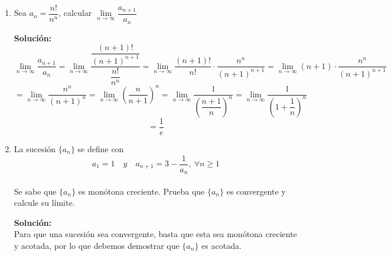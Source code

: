 \documentclass[12pt]{article}
\newenvironment{solucion}
{\begin{mdframed}[backgroundcolor=black!10]
		{\bf Solución:}\\
	}
	{
	\end{mdframed}
}
\newenvironment{preguntas}
{\begin{enumerate}\itemsep12pt
	}
	{
	\end{enumerate}
}
\newcommand{\ra}{\rightarrow}
\begin{document}
\begin{preguntas}
\begin{solucion}
\begin{enumerate}[a)]
\item $\left\{1, -\dfrac{2}{3}, \dfrac{4}{9}, -\dfrac{8}{27}, \dots \right\}$\\
			\\
			Observando la sucesión, resulta evidente que el numerador es $2^n$ y el\\ denominador $3^n$. Además, vemos que es alternante, por lo que el término general será
			$$a_n = (-1)^n \dfrac{2^{n}}{3^{n}}$$
			Luego, el límite de la sucesión es igual al límite del termino general, que sería
			$$\lim\limits_{n\ra \infty} a_n = \lim\limits_{n\ra \infty} (-1)^n \dfrac{2^{n}}{3^{n}} = 
			\lim\limits_{n\ra \infty} (-1)^n \left(\dfrac{2}{3}\right)^n = 0$$
\item $\left\{\sqrt[]{2}, \sqrt[]{2\ \sqrt[]{2}}, \sqrt[]{2\ \sqrt[]{2\ \sqrt[]{2}}}, \dots \right\}$\\
Notemos que la sucesión también la podemos escribir como
$$\left\{\sqrt[]{2}, \sqrt[4]{8}, \sqrt[8]{128}, \dots \right\}$$
$$\left\{\sqrt[]{2}, \sqrt[4]{2^3}, \sqrt[8]{2^7}, \dots \right\}$$
$$\left\{2^{1/2}, 2^{3/4}, 2^{7/8}, \dots \right\}$$
Luego,
$$a_n = 2^{\frac{2^n-1}{2^n}}$$
Finalmente,
$$\lim\limits_{n\ra \infty} a_n = \lim\limits_{n\ra \infty} 2^{\frac{2^n-1}{2^n}} = 2$$
\end{enumerate}
\end{solucion}
\item Sea $a_n = \dfrac{n!}{n^n}$, calcular $\lim\limits_{n \ra \infty} \dfrac{a_{n+1}}{a_n}$
\begin{solucion}
$$\lim\limits_{n \ra \infty} \dfrac{a_{n+1}}{a_n} = \lim\limits_{n \ra \infty} \dfrac{\dfrac{(n+1)!}{(n+1)^{n+1}}}{\dfrac{n!}{n^n}} = \lim\limits_{n \ra \infty} \dfrac{(n+1)!}{n!} \cdot \dfrac{n^n}{(n+1)^{n+1}} =\lim\limits_{n \ra \infty} (n+1) \cdot \dfrac{n^n}{(n+1)^{n+1}}$$
		$$=\lim\limits_{n \ra \infty} \dfrac{n^n}{(n+1)^{n}} = \lim\limits_{n \ra \infty} \left(\dfrac{n}{n+1}\right)^n = \lim\limits_{n \ra \infty} \dfrac{1}{\left(\dfrac{n+1}{n}\right)^n} = \lim\limits_{n \ra \infty} \dfrac{1}{\left(1+\dfrac{1}{n}\right)^n}$$
		$$ = \dfrac{1}{e}$$
\end{solucion}
\item La sucesión $\{a_n\}$ se define con 
		$$a_1=1\quad y\quad a_{n+1} = 3-\dfrac{1}{a_n},\ \forall n\geq 1$$\\
Se sabe que $\{a_n\}$ es monótona creciente. Prueba que $\{a_n\}$ es convergente y calcule su límite.
\begin{solucion}
Para que una sucesión sea convergente, basta que esta sea monótona creciente y acotada, por lo que debemos demostrar que $\{a_n\}$ es acotada.\\


\end{solucion}
\end{preguntas}
\end{document}
